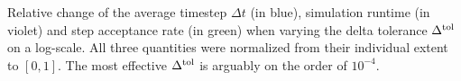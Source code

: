 \documentclass[25pt, a0paper, portrait]{tikzposter}
\begin{document}
\begin{columns}
{      Relative change of the average timestep $\Delta t$ (in blue), simulation runtime (in violet) and step acceptance rate (in green) when varying the delta tolerance $\Delta^{\rm tol}$ on a log-scale. All three quantities were normalized from their individual extent to $[0, 1]$. The most effective $\Delta^{\rm tol}$ is arguably on the order of $10^{-4}$.
      \vspace*{-3.0cm}
    }


\end{columns}
\end{document}
